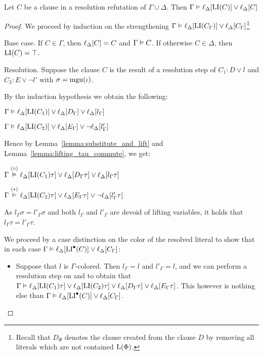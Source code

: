 \documentclass[,%
	draft=false,%
	numbers=noendperiod
	11pt,
	a4paper,
	oneside,%
	openany,
]{memoir}
\begin{document}
\begin{clemma}
	Let $C$ be a clause in a resolution refutation of $\Gamma \cup \Delta$.
	Then
	$\Gamma \vDash \ell_{\Delta}[ \operatorname{LI}(C) ] \lor \ell_{\Delta}[C] $
\end{clemma}
\begin{proof}
	We proceed by induction on the strengthening
	$\Gamma \vDash \ell_{\Delta}[ \operatorname{LI}(C_\Gamma) ] \lor \ell_{\Delta}[C_\Gamma] $\footnote{Recall that $D_\Phi$ denotes the clause created from the clause $D$ by removing all literals which are not contained $\operatorname{L}(\Phi)$.}

	\begin{description}
		\item{} Base case.
			If $C\in \Gamma$, then $\ell_{\Delta}[C] = C$ and $\Gamma \vDash C$.
			If otherwise $C \in \Delta$, then $\operatorname{LI}(C) = \top$.

		\item{} Resolution.
			Suppose the clause $C$ is the result of a resolution step \inference{} of $C_1: D \lor l$ and $C_2: E \lor \lnot l'$ with $\sigma = \operatorname{mgu}(\iota)$.

			By the induction hypothesis we obtain the following:

			$\Gamma \vDash \ell_{\Delta}[\operatorname{LI}(C_1)] \lor \ell_{\Delta}[D_\Gamma] \lor \ell_{\Delta}[l_\Gamma]$

			$\Gamma \vDash \ell_{\Delta}[\operatorname{LI}(C_2)] \lor \ell_{\Delta}[E_\Gamma] \lor \lnot \ell_{\Delta}[l'_\Gamma]$

			Hence by Lemma~\ref{lemma:substitute_and_lift} and Lemma~\ref{lemma:lifting_tau_commute}, we get:

			$\Gamma \stackrel{(\circ)}{\vDash} \ell_{\Delta}[\operatorname{LI}(C_1)\tau] \lor \ell_{\Delta}[D_\Gamma\tau] \lor \ell_{\Delta}[l_\Gamma\tau]$

			$\Gamma \stackrel{(*)}{\vDash} \ell_{\Delta}[\operatorname{LI}(C_2)\tau] \lor \ell_{\Delta}[E_\Gamma\tau] \lor \lnot \ell_{\Delta}[l'_\Gamma\tau]$

			As $l_\Gamma\sigma = l'_\Gamma\sigma$ and both $l_\Gamma$ and $l'_\Gamma$ are devoid of lifting variables, it holds that $l_\Gamma\tau = l'_\Gamma\tau$.

			We proceed by a case distinction on the color of the resolved literal to show that in each case
			$\Gamma \vDash \ell_{\Delta}[\operatorname{LI}^\bullet(C)] \lor \ell_{\Delta}[C_\Gamma]$:
			\begin{itemize}
				\item Suppose that $l$ is $\Gamma$-colored.
					Then $l_\Gamma = l$ and $l'_\Gamma = l$, and we can perform a resolution step on \markA{} and \markB{} to obtain that
					$\Gamma \vDash
					\ell_{\Delta}[\operatorname{LI}(C_1)\tau] \lor
					\ell_{\Delta}[\operatorname{LI}(C_2)\tau] \lor 
					\ell_{\Delta}[D_\Gamma\tau]  \lor
					\ell_{\Delta}[E_\Gamma\tau]$.
					This however is nothing else than $\Gamma \vDash \ell_{\Delta}[\operatorname{LI}^\bullet(C)] \lor \ell_{\Delta}[C_\Gamma]$.


\end{itemize}
\end{description}
\end{proof}
\end{document}
